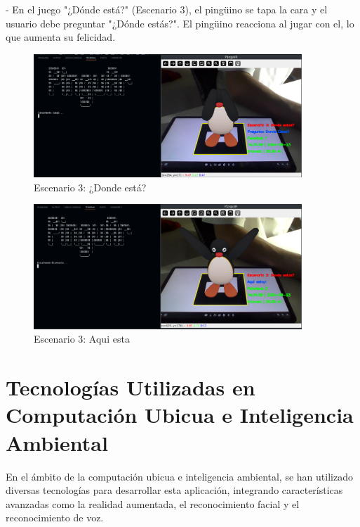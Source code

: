 \documentclass{article}
\begin{document}
\begin{enumerate}
	\newpage

	\vskip 0.1in
    - En el juego "¿Dónde está?" (Escenario 3), el pingüino se tapa la cara y el usuario debe preguntar "¿Dónde estás?". El pingüino reacciona al jugar con el, lo que aumenta su felicidad.
	\vskip 0.1in

	\begin{figure}[htbp]
		\centering
		\includegraphics[width=0.9\textwidth]{./images/6.png}
		\caption{Escenario 3: ¿Donde está?}
		\label{fig:Escenario 3}
		\end{figure}

	\begin{figure}[htbp]
		\centering
		\includegraphics[width=0.9\textwidth]{./images/7.png}
		\caption{Escenario 3: Aqui esta}
		\label{fig:Escenario 3.1}
		\end{figure}
	
	\newpage



\end{enumerate}

\newpage

\section{Tecnologías Utilizadas en Computación Ubicua e Inteligencia Ambiental}

En el ámbito de la computación ubicua e inteligencia ambiental, se han utilizado diversas tecnologías para desarrollar esta aplicación, integrando características avanzadas como la realidad aumentada, el reconocimiento facial y el reconocimiento de voz.
\end{document}
